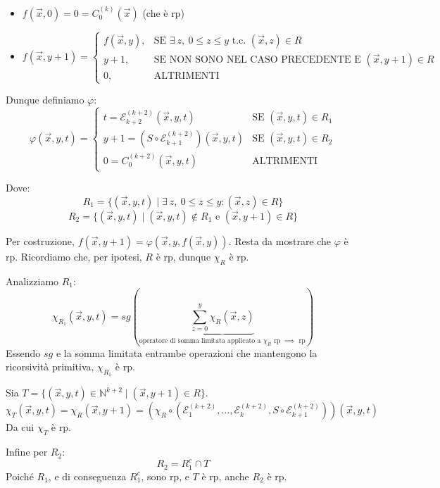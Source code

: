 \begin{itemize}
    \item $f(\vec{x}, 0) = 0 = C_0^{(k)}(\vec{x})$ \quad (che è rp)
    \item $f(\vec{x}, y+1) = \begin{cases} f(\vec{x}, y), & \text{SE } \exists\ z, \ 0 \le z \le y \text{ t.c. } (\vec{x}, z) \in R \\ y+1, & \text{SE NON SONO NEL CASO PRECEDENTE E } (\vec{x}, y+1) \in R \\ 0, & \text{ALTRIMENTI} \end{cases}$
\end{itemize}

Dunque definiamo $\varphi$:
$$
\varphi(\vec{x}, y, t) = 
\begin{cases} 
t = \mathcal{E}_{k+2}^{(k+2)}(\vec{x}, y, t) & \text{SE } (\vec{x}, y, t) \in R_1 \\ 
y+1 = (S \circ \mathcal{E}_{k+1}^{(k+2)})(\vec{x}, y, t) & \text{SE } (\vec{x}, y, t) \in R_2 \\ 
0 = C_0^{(k+2)}(\vec{x}, y, t) & \text{ALTRIMENTI} 
\end{cases}
$$

Dove:
$$ R_1 = \{ (\vec{x}, y, t) \mid \exists\ z, \ 0 \le z \le y : (\vec{x}, z) \in R \} $$
$$ R_2 = \{ (\vec{x}, y, t) \mid (\vec{x}, y, t) \notin R_1 \text{ e } (\vec{x}, y+1) \in R \} $$

Per costruzione, $f(\vec{x}, y+1) = \varphi(\vec{x}, y, f(\vec{x}, y))$. Resta da mostrare che $\varphi$ è rp. 
Ricordiamo che, per ipotesi, $R$ è rp, dunque $\chi_R$ è rp.

Analizziamo $R_1$:
$$ \chi_{R_1}(\vec{x}, y, t) = sg \left( \underbrace{ \sum_{z=0}^{y} \chi_R(\vec{x}, z) }_{\text{operatore di somma limitata applicato a } \chi_R \text{ rp } \implies \text{ rp}} \right) $$
Essendo $sg$ e la somma limitata entrambe operazioni che mantengono la ricorsività primitiva, $\chi_{R_1}$ è rp.

Sia $T = \{ (\vec{x}, y, t) \in \mathbb{N}^{k+2} \mid (\vec{x}, y+1) \in R \}$.
$$ \chi_T(\vec{x}, y, t) = \chi_R(\vec{x}, y+1) = \left( \chi_R \circ (\mathcal{E}_1^{(k+2)}, \dots, \mathcal{E}_k^{(k+2)}, S \circ \mathcal{E}_{k+1}^{(k+2)}) \right)(\vec{x}, y, t) $$
Da cui $\chi_T$ è rp.

Infine per $R_2$:
$$ R_2 = R_1^c \cap T $$
Poiché $R_1$, e di conseguenza $R_1^c$, sono rp, e $T$ è rp, anche $R_2$ è rp.




\vspace{0.6cm}

